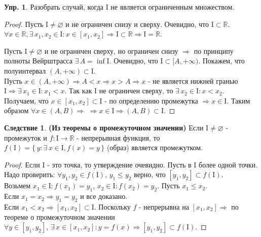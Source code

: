 \documentclass[12pt]{article}
\newcommand{\MR}{\mathbb{R}}
\newcommand{\MI}{\mathrm{I}}
\newcommand{\VN}{\varnothing}
\theoremstyle{definition}
\newtheorem{exrc}{Упр.}
\newtheorem{corollary}{Следствие}
\begin{document}
\begin{exrc}
	Разобрать случай, когда $\MI$ не является ограниченным множеством.
\end{exrc}
\begin{proof}
	Пусть $\MI \neq \VN$ и не ограничен снизу и сверху. Очевидно, что $\MI \subset \MR$. 
	$\forall x \in \MR, \exists \, x_1, x_2 \in \MI \colon x \in [x_1,x_2] \Rightarrow \MI \subset \MR \Rightarrow \MI = \MR$.
	
	Пусть $\MI \neq \VN$ и не ограничен сверху, но ограничен снизу $\Rightarrow$ по принципу полноты Вейрштрасса $\exists \, A = \inf{\MI}$. Очевидно, что $\MI \subset [A,+\infty)$. Покажем, что полуинтервал $(A,+\infty) \subset \MI$. \\
	Пусть $x \in (A,+\infty) \Rightarrow A < x  \Rightarrow x > A \Rightarrow x$ - не является нижней гранью $\MI \Rightarrow \exists \, x_1 \in \MI \colon x_1 < x$. Так как $\MI$ не ограничен сверху, то $\exists \, x_2 \in \MI \colon x < x_2$.\\
	Получаем, что $x \in [x_1,x_2] \subset \MI$ - по определению промежутка $\Rightarrow x \in \MI$. Таким образом $\forall x \in (A,B) \Rightarrow$ $\Rightarrow x \in \MI \Rightarrow (A,B) \subset \MI$.
\end{proof}

\begin{corollary}\textbf{(Из теоремы о промежуточном значении)}
	Если $\MI \neq \VN$ - промежуток и $f \colon \MI \to \MR$ - непрерывная функция, то $f(\MI) = \{\, y \colon \exists \, x \in \MI, f(x) = y \,\}$ (образ) является промежутком.
\end{corollary}

\begin{proof}
	Если $\MI$ - это точка, то утверждение очевидно. Пусть в $\MI$ более одной точки.\\
	Надо проверить: $\forall y_1, y_2 \in f(\MI), \, y_1 \leq y_2$ верно, что $[y_1, y_2] \subset f(\MI)$. \\
	Возьмем $x_1 \in \MI \colon f(x_1) = y_1$, $x_2 \in \MI \colon f(x_2) = y_2$. Пусть $x_1 \leq x_2$. \\
	Если $x_1 = x_2 \Rightarrow y_1 = y_2$ и все доказано. \\
	Если $x_1 < x_2 \Rightarrow [x_1, x_2] \subset \MI$. Поскольку $f$ - непрерывна на $[x_1, x_2] \Rightarrow$ по теореме о промежуточном значении $\forall y \in [y_1, y_2], \, \exists \, x \in [x_1, x_2] \colon y = f(x) \Rightarrow [y_1, y_2] \subset f(\MI)$.
\end{proof}
\end{document}
